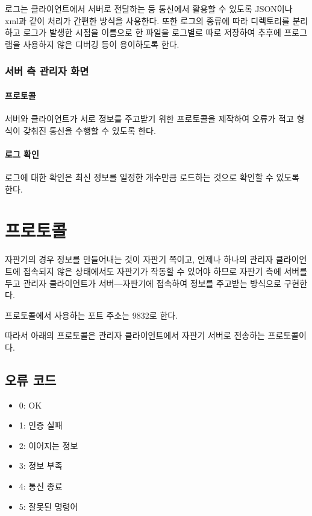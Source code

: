 \documentclass{oblivoir}
\begin{document}
    로그는 클라이언트에서 서버로 전달하는 등 통신에서 활용할 수 있도록
    JSON이나 xml과 같이 처리가 간편한 방식을 사용한다.
    또한 로그의 종류에 따라 디렉토리를 분리하고 로그가 발생한 시점을
    이름으로 한 파일을 로그별로 따로 저장하여 추후에
    프로그램을 사용하지 않은 디버깅 등이 용이하도록 한다.

    \subsubsection{서버 측 관리자 화면}

    \paragraph{프로토콜}

    서버와 클라이언트가 서로 정보를 주고받기 위한 프로토콜을 제작하여
    오류가 적고 형식이 갖춰진 통신을 수행할 수 있도록 한다.

    \paragraph{로그 확인}

    로그에 대한 확인은 최신 정보를 일정한 개수만큼 로드하는 것으로
    확인할 수 있도록 한다.

    \section{프로토콜}
    \label{sec:protocol}

    자판기의 경우 정보를 만들어내는 것이 자판기 쪽이고,
    언제나 하나의 관리자 클라이언트에 접속되지 않은 상태에서도
    자판기가 작동할 수 있어야 하므로
    자판기 측에 서버를 두고 관리자 클라이언트가 서버---자판기에 접속하여
    정보를 주고받는 방식으로 구현한다.

    프로토콜에서 사용하는 포트 주소는 9832로 한다.

    따라서 아래의 프로토콜은 관리자 클라이언트에서 자판기 서버로
    전송하는 프로토콜이다.

    \subsection{오류 코드}

    \begin{itemize}
        \item 0: OK
        \item 1: 인증 실패
        \item 2: 이어지는 정보
        \item 3: 정보 부족
        \item 4: 통신 종료
        \item 5: 잘못된 명령어
    \end{itemize}
\end{document}
